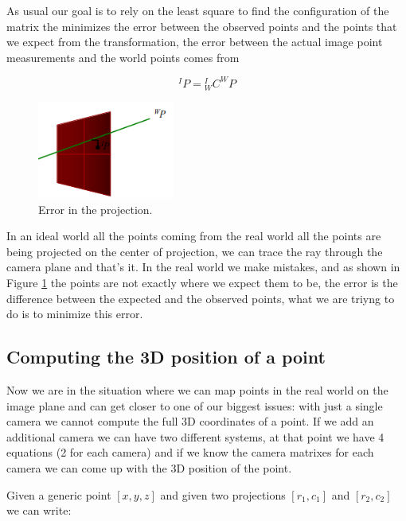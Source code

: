 As usual our goal is to rely on the least square to find the configuration of the matrix the minimizes the error between the observed points and the points that we expect from the transformation, the error between the actual image point measurements and the world points comes from

\[
    {}^IP={}^I_WC^WP  
\]


\begin{figure}[H]
    \centering
    \includegraphics[width=0.4\textwidth]{Figures/proj.png}
    \caption{Error in the projection.}
    \label{fig:proj}
\end{figure}

In an ideal world all the points coming from the real world all the points are being projected on the center of projection, we can trace  the ray through the camera plane and that's it. In the real world we make mistakes, and as shown in Figure \ref{fig:proj} the points are not exactly where we expect them to be, the error is the difference between the expected and the observed points, what we are triyng to do is to minimize this error.

\subsection{Computing the 3D position of a point}

Now we are in the situation where we can map points in the real world on the image plane and can get closer to one of our biggest issues: with just a single camera we cannot compute the full 3D coordinates of a point. If we add an additional camera we can have two different systems, at that point we have 4 equations (2 for each camera) and if we know the camera matrixes for each camera we can come up with the 3D position of the point.

Given a generic point \([x, y, z] \) and given two projections \([r_1, c_1]\) and \([r_2, c_2]\) we can write:

